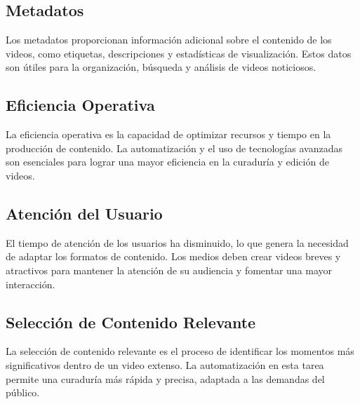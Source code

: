 \subsection{Metadatos}
Los metadatos proporcionan información adicional sobre el contenido de los videos, como etiquetas, descripciones y estadísticas de visualización. Estos datos son útiles para la organización, búsqueda y análisis de videos noticiosos.

\subsection{Eficiencia Operativa}
La eficiencia operativa es la capacidad de optimizar recursos y tiempo en la producción de contenido. La automatización y el uso de tecnologías avanzadas son esenciales para lograr una mayor eficiencia en la curaduría y edición de videos.

\subsection{Atención del Usuario}
El tiempo de atención de los usuarios ha disminuido, lo que genera la necesidad de adaptar los formatos de contenido. Los medios deben crear videos breves y atractivos para mantener la atención de su audiencia y fomentar una mayor interacción.

\subsection{Selección de Contenido Relevante}
La selección de contenido relevante es el proceso de identificar los momentos más significativos dentro de un video extenso. La automatización en esta tarea permite una curaduría más rápida y precisa, adaptada a las demandas del público.
